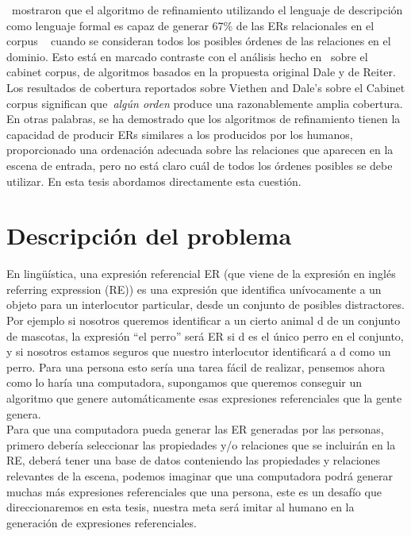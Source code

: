 \cite{arec2:2008:Areces}~mostraron que el algoritmo de refinamiento utilizando el lenguaje de descripci\'on \el como lenguaje formal es capaz de generar 67\% de
las ERs relacionales en el corpus ~\cite{viethen06:_algor_for_gener_refer_expres} cuando se consideran todos los posibles \'ordenes de las relaciones en el dominio. Esto est\'a en marcado contraste con el an\'alisis hecho en~\cite{viethen06:_algor_for_gener_refer_expres} sobre el cabinet corpus, de algoritmos basados en la propuesta original Dale y de Reiter.
Los resultados de cobertura reportados sobre Viethen and 
Dale's sobre el Cabinet corpus significan que~\emph{alg\'un orden} produce una razonablemente amplia cobertura. En otras palabras, se ha demostrado que los algoritmos de refinamiento tienen la capacidad de producir ERs similares a los producidos por los humanos, proporcionado una ordenaci\'on adecuada sobre las relaciones que aparecen
en la escena de entrada, pero no est\'a claro cu\'al de todos los \'ordenes posibles se debe utilizar. En esta tesis abordamos directamente esta cuesti\'on.

\section{Descripci\'on del problema}
\label{sec:problema}

En ling\"u\'{i}stica, una expresi\'on referencial ER (que viene de la expresi\'on en ingl\'es referring expression (RE)) es una expresi\'on que identifica un\'ivocamente a un objeto para un interlocutor particular, desde un conjunto de posibles distractores. Por ejemplo si nosotros queremos identificar a un cierto animal d de un conjunto de mascotas, la expresi\'on ``el perro'' ser\'a ER si d es el \'unico perro en el conjunto, y si nosotros estamos seguros que nuestro interlocutor identificar\'a a d como un perro. Para una persona esto ser\'ia una tarea f\'acil de realizar, pensemos ahora como lo har\'ia una computadora, supongamos que queremos conseguir un algoritmo que genere autom\'aticamente esas expresiones referenciales que la gente genera.\\



 Para que una computadora pueda generar las ER generadas por las personas, primero deber\'ia seleccionar las propiedades y/o relaciones que se incluir\'an en la RE, deber\'a tener una base de datos conteniendo las propiedades y relaciones relevantes de la escena, podemos imaginar que una computadora podr\'a generar muchas m\'as expresiones referenciales que una persona, este es un desaf\'io que direccionaremos en esta tesis, nuestra meta ser\'a imitar al humano en la generaci\'on de expresiones referenciales. 

